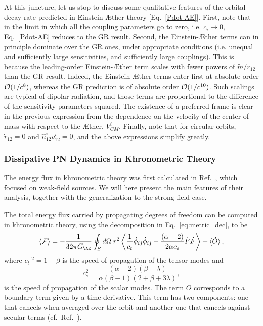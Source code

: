 \documentclass[prd,aps,twocolumn,nofootinbib,showpacs,superscriptaddress]{revtex4-1}
\newcommand\be{\begin{equation}}
\newcommand\ee{\end{equation}}
\begin{document}
At this juncture, let us stop to discuss some qualitative features of the orbital decay rate predicted in Einstein-\AE ther theory [Eq.~\eqref{Pdot-AE}]. First, note that in the limit in which all the coupling parameters go to zero, i.e. $c_{i} \to 0$, Eq.~\eqref{Pdot-AE} reduces to the GR result. Second, the Einstein-\AE ther terms can in principle dominate over the GR
ones, under appropriate conditions (i.e. unequal and sufficiently large sensitivities, and sufficiently large couplings).
This is because the leading-order Einstein-\AE ther term scales with fewer powers of $\tilde{m}/r_{12}$ than the GR result. Indeed, the Einstein-\AE ther terms enter first at absolute order ${\cal{O}}(1/c^{8})$, whereas the GR prediction is of absolute order ${\cal{O}}(1/c^{10})$. Such scalings are typical of dipolar radiation, and those terms are proportional to the difference of the sensitivity  parameters  squared. The existence of a preferred frame is clear in the previous expression from the dependence on the velocity of the center of mass with respect to the \AE ther, $V_{CM}^i$. Finally, note that for circular orbits, $\dot{r}_{12} = 0$ and $\hat n_{12}^i v_{12}^i=0$, and the above expressions simplify greatly. 

\subsubsection{Dissipative PN Dynamics in Khronometric Theory}

The energy flux in khronometric theory was first calculated in Ref.~\cite{Blas:2011zd}, which focused on weak-field sources. We will here present the main features of their analysis, together with the generalization to the strong field case.

The total energy flux carried by propagating degrees of freedom can be computed in
khronometric theory, using the decomposition in Eq.~\eqref{eq:metric_dec}, to be~\cite{Blas:2011zd}
%
\be 
\label{angle-int-Edot}
\langle {\cal F}\rangle=-\frac{1}{32\pi G_{\AE}}\oint_S d \Omega \;
r^2 \left\langle \frac{1}{c_t}\dot \phi_{ij}\dot
\phi_{ij}-\frac{(\alpha-2)}{2\alpha c_s}\dot F \dot F \right\rangle
+ \langle\dot O\rangle\,, 
\ee 
where $c_{t}^{-2}= 1-\beta$ is the speed of propagation of the tensor modes
and  
\be
c_s^2=\frac{(\alpha-2)(\beta+\lambda)}{\alpha(\beta-1)(2+\beta+3\lambda)},
\ee
is the speed of propagation of the scalar modes. The term $\dot O$ 
corresponds to a boundary term given by a time derivative. This term has two components: one that cancels when averaged over the orbit and another one that cancels against secular terms (cf.~Ref.~\cite{Foster:2007gr}).
\end{document}
